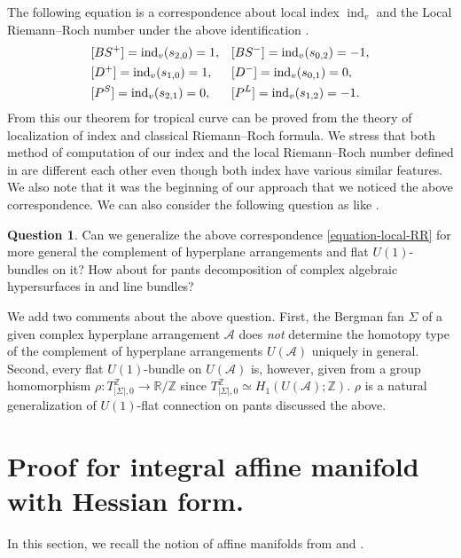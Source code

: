 \documentclass[a4paper,dvipdfmx,reqno,12pt]{amsart}
\theoremstyle{definition}
\newtheorem{question}[theorem]{Question}
\newcommand{\opn}[1]{\operatorname{#1}}
\numberwithin{equation}{section}
\begin{document}
The following equation is a correspondence about 
local index $\opn{ind}_v$ and the Local 
Riemann--Roch number under the above 
identification \cite[Theorem 6.7]{MR2676658}.
\begin{align} \label{equation-local-RR}
& [BS^{+}]=\opn{ind}_v(s_{2,0})=1, 
&& [BS^{-}]=\opn{ind}_v(s_{0,2})=-1,\notag \\
& [D^{+}]=\opn{ind}_v(s_{1,0})=1,
&& [D^{-}]=\opn{ind}_v(s_{0,1})=0, \\
& [P^{S}]=\opn{ind}_v(s_{2,1})=0,
&& [P^{L}]=\opn{ind}_v(s_{1,2})=-1 \notag.
\end{align}
From this our theorem for tropical curve can be 
proved from the theory of localization of index 
and classical Riemann--Roch formula.
We stress that both method of computation
of our index and the local Riemann--Roch number
defined in \cite{MR2676658} are different 
each other even though both index have various 
similar features.
We also note that it was the beginning of our 
approach that we 
noticed the above correspondence.
We can also consider the following question as 
like \cite{auroux2022lagrangian}.

\begin{question}
Can we generalize the 
above correspondence \ref{equation-local-RR}
for more general the complement of
hyperplane arrangements and flat $U(1)$-bundles on it?
How about for pants decomposition of
  complex algebraic hypersurfaces in \cite{MR2079993} and line bundles?
\end{question}

We add two comments about the above question. 
First, the Bergman fan $\Sigma$ of a given complex 
hyperplane arrangement $\mathcal{A}$ does \emph{not} 
determine 
the homotopy type of the complement of hyperplane
arrangements $U(\mathcal{A})$ uniquely in general.
Second, every flat $U(1)$-bundle on 
$U(\mathcal{A})$ is, 
however, given
from a group homomorphism 
$\rho\colon T_{|\Sigma|,0}^{\mathbb{Z}}\to 
\mathbb{R}/\mathbb{Z}$ since 
$T_{|\Sigma|,0}^{\mathbb{Z}}\simeq 
H_1(U(\mathcal{A});\mathbb{Z})$.
$\rho$ is a natural generalization of $U(1)$-flat 
connection on pants discussed the above.



\section{Proof for integral affine manifold with Hessian form.}
\label{section-integral-affine-manifold}
In this section,
we recall the notion of affine manifolds from
\cite{MR2293045,
goldmanRadianceObstructionParallel1984a,
MR2181810,
grossMirrorSymmetryLogarithmic2006a} and 
\cite[Chapter 6]{MR2567952}.
\end{document}
